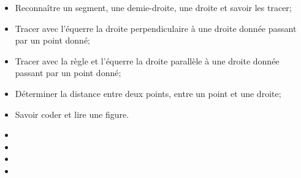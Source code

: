 \begin{myobj}
	\begin{itemize}
		\item Reconnaître un segment, une demie-droite, une droite et savoir les tracer;
		\item Tracer avec l’équerre la droite perpendiculaire à une droite donnée passant par un point donné;
		\item Tracer avec la règle et l’équerre la droite parallèle à une droite donnée passant par un point donné;
		\item Déterminer la distance entre deux points, entre un point et une droite;
		\item Savoir coder et lire une figure.
	\end{itemize}
\end{myobj}

\begin{mycomp}
	\begin{itemize}
		\item {} 
		\item {} 
		\item {} 
		\item {}
		
	\end{itemize}
\end{mycomp}